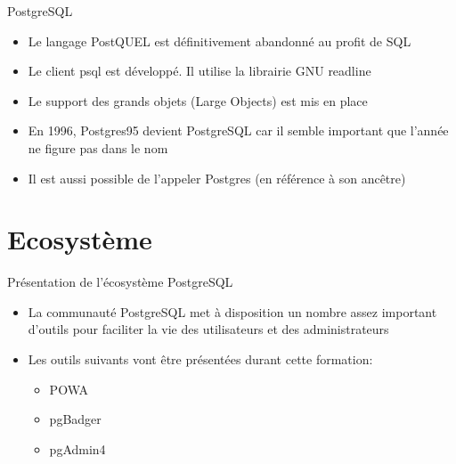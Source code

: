 
\begin{frame}[fragile]{PostgreSQL}

   \begin{itemize}
      \item Le langage PostQUEL est définitivement abandonné au profit de SQL
      \item Le client psql est développé. Il utilise la librairie GNU readline
      \item Le support des grands objets (Large Objects) est mis en place
      \item En 1996, Postgres95 devient PostgreSQL car il semble important que l'année ne figure pas dans le nom
      \item Il est aussi possible de l'appeler Postgres (en référence à son ancêtre)
   \end{itemize}

\end{frame}


\section{Ecosystème}

\begin{frame}{Présentation de l'écosystème PostgreSQL}

   \begin{itemize}
      \item La communauté PostgreSQL met à disposition un nombre assez important d'outils pour faciliter la vie des utilisateurs et des administrateurs
      \item Les outils suivants vont être présentées durant cette formation:
      \begin{itemize}
         \item POWA
         \item pgBadger
         \item pgAdmin4
      \end{itemize}
   \end{itemize}


\end{frame}


